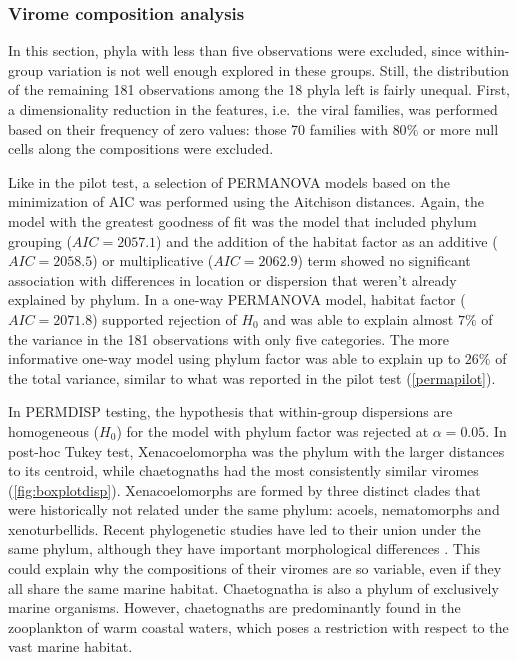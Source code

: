 \documentclass[
  openany]{book}
\begin{document}
\hypertarget{virome-composition-analysis}{%
\subsubsection{Virome composition analysis}\label{virome-composition-analysis}}

In this section, phyla with less than five observations were excluded, since within-group variation is not well enough explored in these groups. Still, the distribution of the remaining 181 observations among the 18 phyla left is fairly unequal. First, a dimensionality reduction in the features, i.e.~the viral families, was performed based on their frequency of zero values: those 70 families with \(80\%\) or more null cells along the compositions were excluded.

Like in the pilot test, a selection of PERMANOVA models based on the minimization of AIC was performed using the Aitchison distances. Again, the model with the greatest goodness of fit was the model that included phylum grouping (\(AIC = 2057.1\)) and the addition of the habitat factor as an additive (\(AIC = 2058.5\)) or multiplicative (\(AIC = 2062.9\)) term showed no significant association with differences in location or dispersion that weren't already explained by phylum. In a one-way PERMANOVA model, habitat factor (\(AIC = 2071.8\)) supported rejection of \(H_0\) and was able to explain almost \(7\%\) of the variance in the 181 observations with only five categories. The more informative one-way model using phylum factor was able to explain up to \(26\%\) of the total variance, similar to what was reported in the pilot test (\ref{permapilot}).

In PERMDISP testing, the hypothesis that within-group dispersions are homogeneous (\(H_0\)) for the model with phylum factor was rejected at \(\alpha = 0.05\). In post-hoc Tukey test, Xenacoelomorpha was the phylum with the larger distances to its centroid, while chaetognaths had the most consistently similar viromes (\ref{fig:boxplotdisp}). Xenacoelomorphs are formed by three distinct clades that were historically not related under the same phylum: acoels, nematomorphs and xenoturbellids. Recent phylogenetic studies have led to their union under the same phylum, although they have important morphological differences \autocite{Cannon2016}. This could explain why the compositions of their viromes are so variable, even if they all share the same marine habitat. Chaetognatha is also a phylum of exclusively marine organisms. However, chaetognaths are predominantly found in the zooplankton of warm coastal waters, which poses a restriction with respect to the vast marine habitat.
\end{document}
